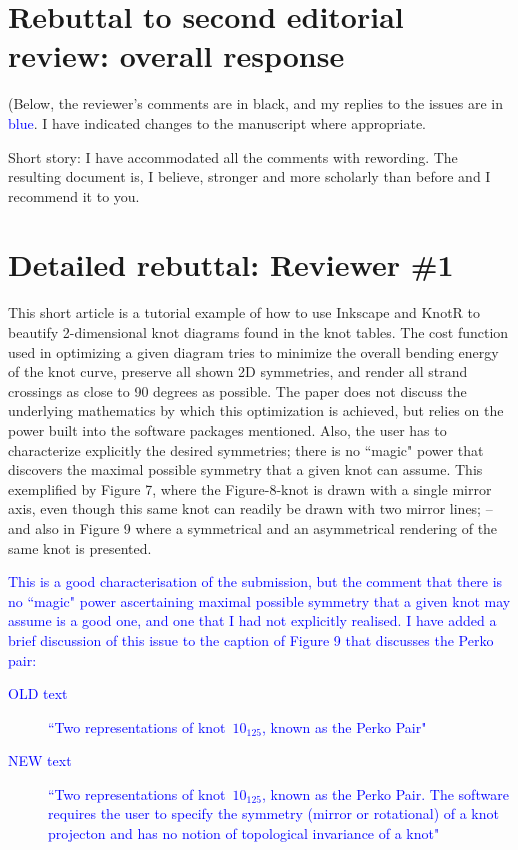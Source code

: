 \documentclass[12pt]{article}
\begin{document}
\section*{Rebuttal to second editorial review: overall response}

(Below, the reviewer's comments are in black, and my replies to the
issues are in \textcolor{blue}{blue}.  I have indicated changes to the
manuscript where appropriate.

Short story: I have accommodated all the comments with rewording.  The
resulting document is, I believe, stronger and more scholarly than
before and I recommend it to you.  


\section*{Detailed rebuttal: Reviewer \#1}

This short article is a tutorial example of how to use Inkscape and
KnotR to beautify 2-dimensional knot diagrams found in the knot
tables.  The cost function used in optimizing a given diagram tries to
minimize the overall bending energy of the knot curve, preserve all
shown 2D symmetries, and render all strand crossings as close to 90
degrees as possible.  The paper does not discuss the underlying
mathematics by which this optimization is achieved, but relies on the
power built into the software packages mentioned.  Also, the user has
to characterize explicitly the desired symmetries; there is no ``magic"
power that discovers the maximal possible symmetry that a given knot
can assume.  This exemplified by Figure 7, where the Figure-8-knot is
drawn with a single mirror axis, even though this same knot can
readily be drawn with two mirror lines; -- and also in Figure 9 where
a symmetrical and an asymmetrical rendering of the same knot is
presented.

\textcolor{blue}{This is a good characterisation of the submission,
  but the comment that there is no ``magic" power ascertaining
  maximal possible symmetry that a given knot may assume is a good
  one, and one that I had not explicitly realised.  I have added a
  brief discussion of this issue to the caption of Figure 9 that
  discusses the Perko pair:
  \begin{description}
    \item[OLD text] ``Two representations of knot~$10_{125}$, known as the 
     Perko Pair"
    \item[NEW text] ``Two representations of knot~$10_{125}$, known as the 
      Perko Pair.   The software requires the user to specify the symmetry
      (mirror or rotational) of a knot projecton and has no notion of
      topological invariance of a knot"
      \end{description}
}
\end{document}
